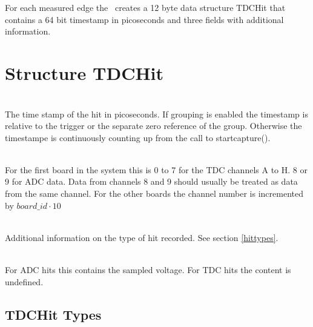 For each measured edge the \deviceName\ creates a 12 byte data structure TDCHit that contains a 64 bit timestamp in picoseconds and three fields with additional information. 

\section{Structure TDCHit}
\label{TDCHit}
\\
The time stamp of the hit in picoseconds. If grouping is enabled the timestamp is relative to the trigger or the separate zero reference of the group. 
Otherwise the timestampe is continuously counting up from the call to \textsf{start\tu capture()}.

\\
For the first board in the system this is 0 to 7 for the TDC channels A to H. 8 or 9 for ADC data. Data from channels 8 and 9 should usually be treated as data from the same channel. 
For the other boards the channel number is incremented by $board\_id \cdot 10$

\\
Additional information on the type of hit recorded. See section \ref{hittypes}.

\\
For ADC hits this contains the sampled voltage. For TDC hits the content is undefined.

\newpage
\subsection{TDCHit Types \label{hittypes}}
\newcommand{\HTYPE}{\PREFIX TDCHIT\tu TYPE\tu}

